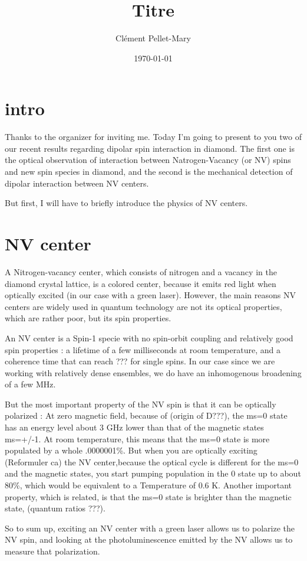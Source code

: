 \documentclass[a4paper]{article}
\title{Titre}
\author{Clément Pellet-Mary}
\date\today
\begin{document}
\section{intro}
Thanks to the organizer for inviting me. Today I'm going to present to you two of our recent results regarding dipolar spin interaction in diamond. The first one is the optical observation of interaction between Natrogen-Vacancy (or NV) spins and new spin species in diamond, and the second is the mechanical detection of dipolar interaction between NV centers.

But first, I will have to briefly introduce the physics of NV centers.

\section{NV center}
A Nitrogen-vacancy center, which consists of nitrogen and a vacancy in the diamond crystal lattice, is a colored center, because it emits red light when optically excited (in our case with a green laser). However, the main reasons NV centers are widely used in quantum technology are not its optical properties, which are rather poor, but its spin properties.

An NV center is a Spin-1 specie with no spin-orbit coupling and relatively good spin properties : a lifetime of a few milliseconds at room temperature, and a coherence time that can reach ??? for single spins. In our case since we are working with relatively dense ensembles, we do have an inhomogenous broadening of a few MHz. 

But the most important property of the NV spin is that it can be optically polarized : At zero magnetic field, because of (origin of D???), the ms=0 state has an energy level about 3 GHz lower than that of the magnetic states ms=+/-1. At room temperature, this means that the ms=0 state is more populated by a whole .0000001\%. But when you are optically exciting (Reformuler ca) the NV center,because the optical cycle is different for the ms=0 and the magnetic states, you start pumping population in the 0 state up to about 80\%, which would be equivalent to a Temperature of 0.6 K. Another important property, which is related, is that the ms=0 state is brighter than the magnetic state, (quantum ratios ???).

So to sum up, exciting an NV center with a green laser allows us to polarize the NV spin, and looking at the photoluminescence emitted by the NV allows us to measure that polarization.
\end{document}
